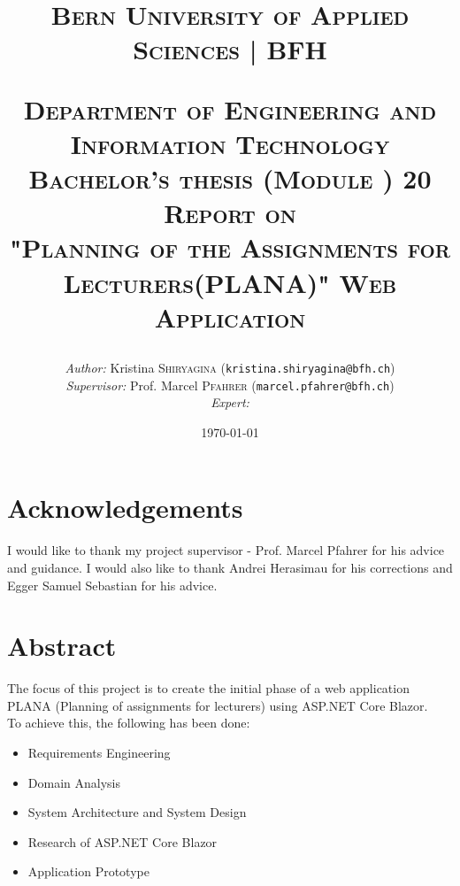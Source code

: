 \documentclass{scrartcl}
\begin{document}
\begin{titlepage}


\title{\textsc{\LARGE Bern University of Applied Sciences | BFH }\\[1cm]
\begin{center}
\end{center}
\textsc{\small Department of Engineering and Information Technology}\\
\textsc{\small Bachelor's thesis (Module ) 20}\\[1cm]
\textsc{\small Report on  }\\
\textsc{"Planning of the Assignments for Lecturers(PLANA)" Web Application}}
\date{\today}   %
\author{\textit{Author: }Kristina \textsc{Shiryagina} (\texttt{kristina.shiryagina@bfh.ch}) \\
 \textit{Supervisor: } Prof. Marcel \textsc{Pfahrer}  (\texttt{marcel.pfahrer@bfh.ch})\\
 \textit{Expert: }  \textsc{} \\
 }
\maketitle	

\newpage


	
\tableofcontents
\clearpage
\end{titlepage}

\setcounter{secnumdepth}{-2}%



\section{Acknowledgements}
I would like to thank my project supervisor - Prof. Marcel Pfahrer for his advice and guidance. 
I would also like to thank Andrei Herasimau for his corrections and Egger Samuel Sebastian for his advice.


\section{Abstract}
The focus of this project is to create the initial phase of a web application PLANA (Planning of assignments for lecturers) using ASP.NET Core Blazor.\\


To achieve this, the following has been done:
\begin{itemize}
\item Requirements Engineering
\item Domain Analysis
\item System Architecture and System Design
\item Research of  ASP.NET Core Blazor
\item Application Prototype
\end{itemize}
\end{document}
